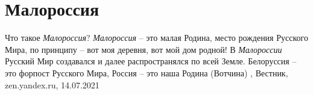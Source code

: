 
 
 
 
 
\chapter{Малороссия}

Что такое \emph{Малороссия}?  \emph{Малороссия} – это малая Родина, место рождения Русского
Мира, по принципу – вот моя деревня, вот мой дом родной! В \emph{Малороссии} Русский
Мир создавался и далее распространялся по всей Земле. Белоруссия – это форпост
Русского Мира, Россия – это наша Родина (Вотчина)
, Вестник, zen.yandex.ru, 14.07.2021
